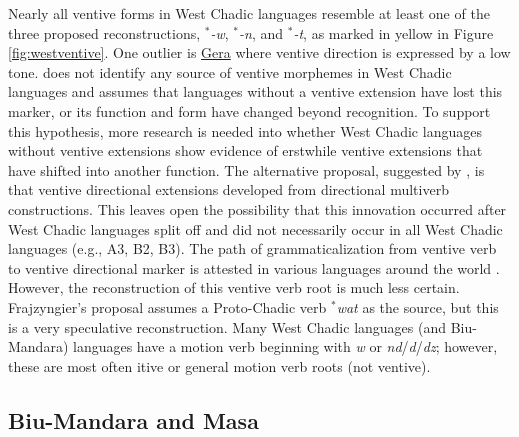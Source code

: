 Nearly all ventive forms in West Chadic languages resemble at least one of the three proposed reconstructions, $^\ast$\textit{-w}, $^\ast$\textit{-n}, and $^\ast$\textit{-t}, as marked in yellow in Figure \ref{fig:westventive}. One outlier is \hyperref[gera]{Gera} where ventive direction is expressed by a low tone. \citet[309]{schuhChadicCornucopia2017} does not identify any source of ventive morphemes in West Chadic languages and assumes that languages without a ventive extension have lost this marker, or its function and form have changed beyond recognition. To support this hypothesis, more research is needed into whether West Chadic languages without ventive extensions show evidence of erstwhile ventive extensions that have shifted into another function. The alternative proposal, suggested by \citet{frajzyngierVentiveCentrifugalChadic1987}, is that ventive directional extensions developed from directional multiverb constructions. This leaves open the possibility that this innovation occurred after West Chadic languages split off and did not necessarily occur in all West Chadic languages (e.g., A3, B2, B3). The path of grammaticalization from ventive verb to ventive directional marker is attested in various languages around the world \citep[85--86]{heineWorldLexiconGrammaticalization2002}. However, the reconstruction of this ventive verb root is much less certain. Frajzyngier's proposal assumes a Proto-Chadic verb $^\ast$\textit{wat} as the source, but this is a very speculative reconstruction. Many West Chadic languages (and Biu-Mandara) languages have a motion verb beginning with \textit{w} or \textit{nd}/\textit{d}/\textit{dz}; however, these are most often itive or general motion verb roots (not ventive).  

\subsection{Biu-Mandara and Masa}

